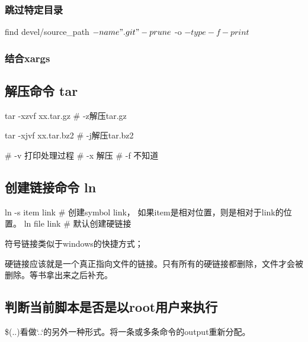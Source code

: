 \subsubsection{跳过特定目录}

\begin{Bash}[]

find devel/source_path \( -name ".git" -prune \) -o \( -type -f -print \)

\end{Bash}

\subsubsection{结合xargs}




\subsection{解压命令 tar}

\begin{Bash}
tar -xzvf xx.tar.gz # -z解压tar.gz

tar -xjvf xx.tar.bz2 # -j解压tar.bz2

# -v 打印处理过程
# -x 解压
# -f 不知道
\end{Bash}


\subsection{创建链接命令 ln}

\begin{Bash}
ln -s item link # 创建symbol link， 如果item是相对位置，则是相对于link的位置。
ln file link # 默认创建硬链接
\end{Bash}


符号链接类似于windows的快捷方式；


硬链接应该就是一个真正指向文件的链接。只有所有的硬链接都删除，文件才会被删除。等书拿出来之后补充。

\begin{Bash}

\end{Bash}

\subsection{判断当前脚本是否是以root用户来执行}


\$(..)看做`..`的另外一种形式。将一条或多条命令的output重新分配。



